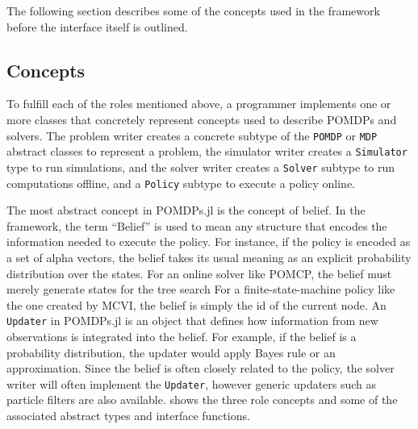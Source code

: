 The following section describes some of the concepts used in the framework before the interface itself is outlined.

\subsection{Concepts} \label{sec:concepts}

To fulfill each of the roles mentioned above, a programmer implements one or more classes that concretely represent concepts used to describe POMDPs and solvers.
The problem writer creates a concrete subtype of the \texttt{POMDP} or \texttt{MDP} abstract classes to represent a problem, the simulator writer creates a \texttt{Simulator} type to run simulations, and the solver writer creates a \texttt{Solver} subtype to run computations offline, and a \texttt{Policy} subtype to execute a policy online.

The most abstract concept in POMDPs.jl is the concept of belief.
In the framework, the term ``Belief'' is used to mean any structure that encodes the information needed to execute the policy.
For instance, if the policy is encoded as a set of alpha vectors, the belief takes its usual meaning as an explicit probability distribution over the states.
For an online solver like POMCP, the belief must merely generate states for the tree search
For a finite-state-machine policy like the one created by MCVI, the belief is simply the id of the current node.
An \texttt{Updater} in POMDPs.jl is an object that defines how information from new observations is integrated into the belief.
For example, if the belief is a probability distribution, the updater would apply Bayes rule or an approximation.
Since the belief is often closely related to the policy, the solver writer will often implement the \texttt{Updater}, however generic updaters such as particle filters are also available.
 shows the three role concepts and some of the associated abstract types and interface functions.

